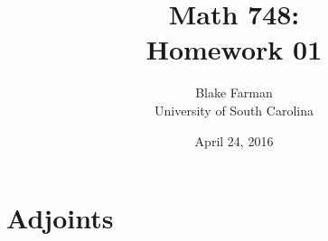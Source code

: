 \documentclass[10pt]{amsart}
\author{Blake Farman\\University of South Carolina}
\title{Math 748:\\Homework 01}
\date{April 24, 2016}
\begin{document}

\providecommand{\p}{\mathfrak{p}}
\providecommand{\m}{\mathfrak{m}}
\providecommand{\Deck}[1]{\operatorname{Deck}\left(#1\right)}
\newtheorem{thm}{Theorem}
\newtheorem{lem}{Lemma}
\newtheorem{cor}{Corollary}
\newtheorem{prop}{Proposition}
\theoremstyle{definition}
\newtheorem{defn}{Definition}
\newtheorem{rmk}{Remark}
\newtheorem{ex}{Example}

\newcommand{\A}{\mathscr{A}}
\renewcommand{\C}{\mathscr{C}}
\newcommand{\D}{\mathscr{D}}
\newcommand{\F}{\mathscr{F}}
\newcommand{\G}{\mathscr{G}}

\section{Adjoints}
\end{document}
